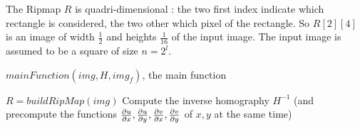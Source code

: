 

\label{pseudo_code_Ripmap}



The Ripmap $R$ is quadri-dimensional  : the two first index indicate which rectangle is considered, the two other which pixel of the rectangle. So $R[2][4]$ is an image of width $\frac{1}{2}$ and heights $\frac{1}{16}$ of the input image. The input image is assumed to be a square of size $n=2^l$.





\medbreak
\medbreak
\begin{algorithm}[H]
\caption{$mainFunction(img,H,img_f)$, the main function}
$R = buildRipMap(img)$\;
Compute the inverse homography $H^{-1}$ (and precompute the functions $\frac{\partial u}{\partial x},\frac{\partial u}{\partial y},\frac{\partial v}{\partial x},\frac{\partial v}{\partial y}$ of $x,y$ at the same time)\;
\end{algorithm}

\medbreak
\medbreak
\medbreak
\medbreak

